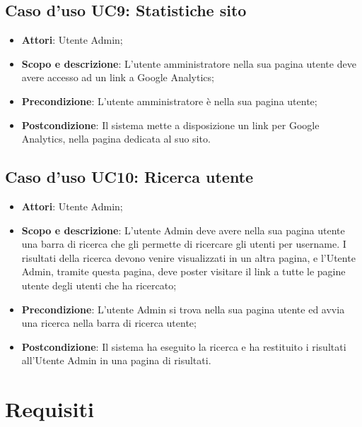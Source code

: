 \documentclass[12pt,a4paper,titlepage]{article}
\begin{document}
	\subsection{Caso d'uso UC9: Statistiche sito}
	\label{UC9}
	\begin{itemize}
		\item \textbf{Attori}: Utente Admin;
		\item \textbf{Scopo e descrizione}: L'utente amministratore nella sua pagina utente deve avere accesso ad un link a Google Analytics;
		\item \textbf{Precondizione}: L'utente amministratore è nella sua pagina utente;
		\item \textbf{Postcondizione}: Il sistema mette a disposizione un link per Google Analytics, nella pagina dedicata al suo sito.
	\end{itemize}

	\subsection{Caso d'uso UC10: Ricerca utente}
	\label{UC10}
	\begin{itemize}
		\item \textbf{Attori}: Utente Admin;
		\item \textbf{Scopo e descrizione}: L'utente Admin deve avere nella sua pagina utente una barra di ricerca che gli permette di ricercare gli utenti per username. I risultati della ricerca devono venire visualizzati in un altra pagina, e l'Utente Admin, tramite questa pagina, deve poster visitare il link a tutte le pagine utente degli utenti che ha ricercato;
		\item \textbf{Precondizione}: L'utente Admin si trova nella sua pagina utente ed avvia una ricerca nella barra di ricerca utente;
		\item \textbf{Postcondizione}: Il sistema ha eseguito la ricerca e ha restituito i risultati all'Utente Admin in una pagina di risultati.
	\end{itemize}
	
	\newpage
	\section{Requisiti}
\end{document}
